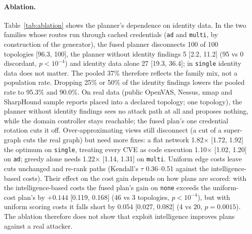 \documentclass[11pt]{article}
\begin{document}
\paragraph{Ablation.} Table~\ref{tab:ablation} shows the planner's dependence on identity data. In the two families
whose routes run through cached credentials (\texttt{ad} and \texttt{multi}, by construction of the generator), the
fused planner disconnects 100 of 100 topologies [96.3, 100], the planner without identity findings 5 [2.2, 11.2]
(95 vs 0 discordant, $p < 10^{-4}$) and identity data alone 27 [19.3, 36.4]; in \texttt{single} identity data does
not matter. The pooled 37\% therefore reflects the family mix, not a population rate. Dropping 25\% or 50\% of the
identity findings lowers the pooled rate to 95.3\% and 90.0\%. On real data (public OpenVAS, Nessus, nmap and
SharpHound sample reports placed into a declared topology; one topology), the planner without identity findings sees
no attack path at all and proposes nothing, while the domain controller stays reachable; the fused plan's one
credential rotation cuts it off.
Over-approximating views still disconnect (a cut of a super-graph cuts the real graph) but need more fixes: a flat
network 1.82$\times$ [1.72, 1.92] the optimum on \texttt{single}, treating every CVE as code execution 1.10$\times$
[1.02, 1.20] on \texttt{ad}; greedy alone needs 1.22$\times$ [1.14, 1.31] on \texttt{multi}. Uniform edge costs leave
cuts unchanged and re-rank paths (Kendall's $\tau$ 0.36--0.51 against the intelligence-based costs). Their effect on
the cost gain depends on how plans are scored: with the intelligence-based costs the fused plan's gain on
\texttt{none} exceeds the uniform-cost plan's by $+0.144$ [0.119, 0.168] (46 vs 3 topologies, $p < 10^{-4}$), but
with uniform scoring costs it falls short by $0.054$ [0.027, 0.082] (4 vs 20, $p = 0.0015$). The ablation therefore
does not show that exploit intelligence improves plans against a real attacker.
\end{document}
